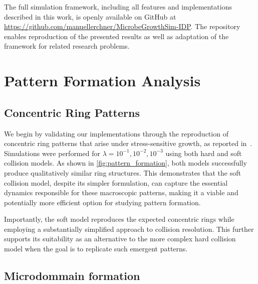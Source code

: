 \documentclass[conference]{IEEEtran}
\begin{document}
The full simulation framework, including all features and implementations described in this work, is openly available on GitHub at \url{https://github.com/manuellerchner/MicrobeGrowthSim-IDP}.
The repository enables reproduction of the presented results as well as adaptation of the framework for related research problems.

\section{Pattern Formation Analysis}

\subsection{Concentric Ring Patterns}

We begin by validating our implementations through the reproduction of concentric ring patterns that arise under stress-sensitive growth, as reported in~\cite{Weady2024}. Simulations were performed for $\lambda = 10^{-1}, 10^{-2}, 10^{-3}$ using both hard and soft collision models. As shown in \autoref{fig:pattern_formation}, both models successfully produce qualitatively similar ring structures. This demonstrates that the soft collision model, despite its simpler formulation, can capture the essential dynamics responsible for these macroscopic patterns, making it a viable and potentially more efficient option for studying pattern formation.

Importantly, the soft model reproduces the expected concentric rings while employing a substantially simplified approach to collision resolution. This further supports its suitability as an alternative to the more complex hard collision model when the goal is to replicate such emergent patterns.



\subsection{Microdommain formation}

~\cite{You2018}
\end{document}
